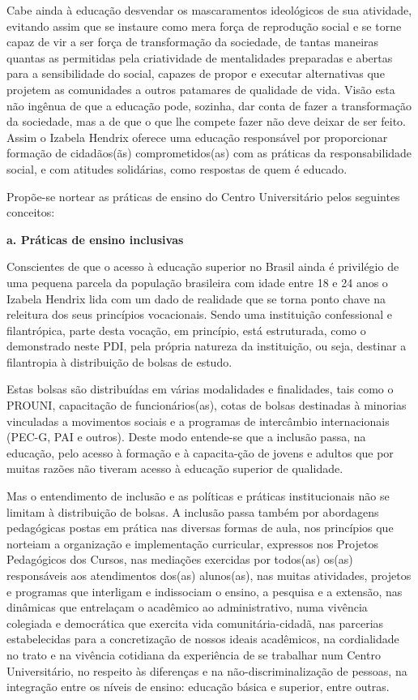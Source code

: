 \documentclass[a4paper, 12pt, openright, oneside, german, french, english, brazil]{abntex2}
\begin{document}
Cabe ainda à educação desvendar os mascaramentos ideológicos de sua atividade, evitando assim que se instaure como mera força de reprodução social e se torne capaz de vir a ser força de transformação da sociedade, de tantas maneiras quantas as permitidas pela criatividade de mentalidades preparadas e abertas para a sensibilidade do social, capazes de propor e executar alternativas que projetem as comunidades a outros patamares de qualidade de vida. Visão esta não ingênua de que a educação pode, sozinha, dar conta de fazer a transformação da sociedade, mas a de que o que lhe compete fazer não deve deixar de ser feito. Assim o Izabela Hendrix oferece uma educação responsável por proporcionar formação de cidadãos(ãs) comprometidos(as) com as práticas da responsabilidade social, e com atitudes solidárias, como respostas de quem é educado.

Propõe-se nortear as práticas de ensino do Centro Universitário pelos seguintes conceitos:

\vspace{5mm}

\textbf{a. Práticas de ensino inclusivas}

Conscientes de que o acesso à educação superior no Brasil ainda é privilégio de uma pequena parcela da população brasileira com idade entre 18 e 24 anos o Izabela Hendrix lida com um dado de realidade que se torna ponto chave na releitura dos seus princípios vocacionais. Sendo uma instituição confessional e filantrópica, parte desta vocação, em princípio, está estruturada, como o demonstrado neste PDI, pela própria natureza da instituição, ou seja, destinar a filantropia à distribuição de bolsas de estudo.

Estas bolsas são distribuídas em várias modalidades e finalidades, tais como o PROUNI, capacitação de funcionários(as), cotas de bolsas destinadas à minorias vinculadas a movimentos sociais e a programas de intercâmbio internacionais (PEC-G, PAI e outros). Deste modo entende-se que a inclusão passa, na educação, pelo acesso à formação e à capacita-ção de jovens e adultos que por muitas razões não tiveram acesso à educação superior de qualidade.

Mas o entendimento de inclusão e as políticas e práticas institucionais não se limitam à distribuição de bolsas. A inclusão passa também por abordagens pedagógicas postas em prática nas diversas formas de aula, nos princípios que norteiam a organização e implementação curricular, expressos nos Projetos Pedagógicos dos Cursos, nas mediações exercidas por todos(as) os(as) responsáveis aos atendimentos dos(as) alunos(as), nas muitas atividades, projetos e programas que interligam e indissociam o ensino, a pesquisa e a extensão, nas dinâmicas que entrelaçam o acadêmico ao administrativo, numa vivência colegiada e democrática que exercita vida comunitária-cidadã, nas parcerias estabelecidas para a concretização de nossos ideais acadêmicos, na cordialidade no trato e na vivência cotidiana da experiência de se trabalhar num Centro Universitário, no respeito às diferenças e na não-discriminalização de pessoas, na integração entre os níveis de ensino: educação básica e superior, entre outras.
\end{document}
